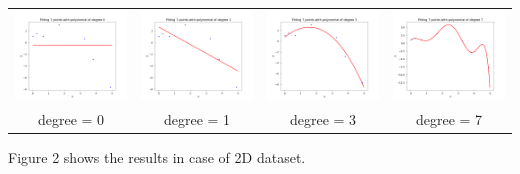 \documentclass[11pt]{article}
\begin{document}
\begin{center}
    \setlength\tabcolsep{0pt}
    \begin{tabular}{cccc}
      \includegraphics[width=5cm]{regression/1d-degree=0-train-fig.png}
        & \includegraphics[width=5cm]{regression/1d-degree=1-train-fig.png}
        &\includegraphics[width=5cm]{regression/1d-degree=3-train-fig.png}
          & \includegraphics[width=5cm]{regression/1d-degree=7-train-fig.png}\\
          degree = 0 & degree = 1
          & degree = 3 & degree = 7\\
    \end{tabular}
\end{center}

Figure 2 shows the results in case of 2D dataset.
\end{document}
